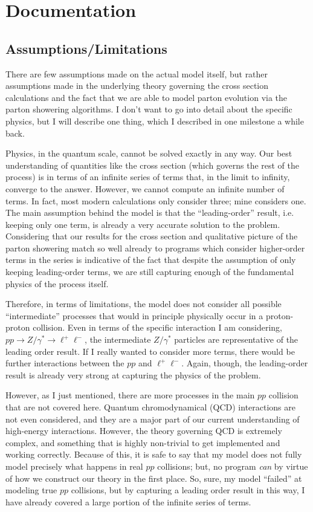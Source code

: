 \section{Documentation}

\subsection{Assumptions/Limitations}

There are few assumptions made on the actual model itself, but rather assumptions made in the underlying theory governing the cross section calculations and the fact that we are able to model parton evolution via the parton showering algorithms. I don't want to go into detail about the specific physics, but I will describe one thing, which I described in one milestone a while back.

Physics, in the quantum scale, cannot be solved exactly in any way. Our best understanding of quantities like the cross section (which governs the rest of the process) is in terms of an infinite series of terms that, in the limit to infinity, converge to the answer. However, we cannot compute an infinite number of terms. In fact, most modern calculations only consider three; mine considers one. The main assumption behind the model is that the ``leading-order'' result, i.e. keeping only one term, is already a very accurate solution to the problem. Considering that our results for the cross section and qualitative picture of the parton showering match so well already to programs which consider higher-order terms in the series is indicative of the fact that despite the assumption of only keeping leading-order terms, we are still capturing enough of the fundamental physics of the process itself.

Therefore, in terms of limitations, the model does not consider all possible ``intermediate'' processes that would in principle physically occur in a proton-proton collision. Even in terms of the specific interaction I am considering, $pp \rightarrow Z/\gamma^* \rightarrow \ell^+\ell^-$, the intermediate $Z/\gamma^*$ particles are representative of the leading order result. If I really wanted to consider more terms, there would be further interactions between the $pp$ and $\ell^+\ell^-$. Again, though, the leading-order result is already very strong at capturing the physics of the problem.

However, as I just mentioned, there are more processes in the main $pp$ collision that are not covered here. Quantum chromodynamical (QCD) interactions are not even considered, and they are a major part of our current understanding of high-energy interactions. However, the theory governing QCD is extremely complex, and something that is highly non-trivial to get implemented and working correctly. Because of this, it is safe to say that my model does not fully model precisely what happens in real $pp$ collisions; but, no program \textit{can} by virtue of how we construct our theory in the first place. So, sure, my model ``failed'' at modeling true $pp$ collisions, but by capturing a leading order result in this way, I have already covered a large portion of the infinite series of terms.

